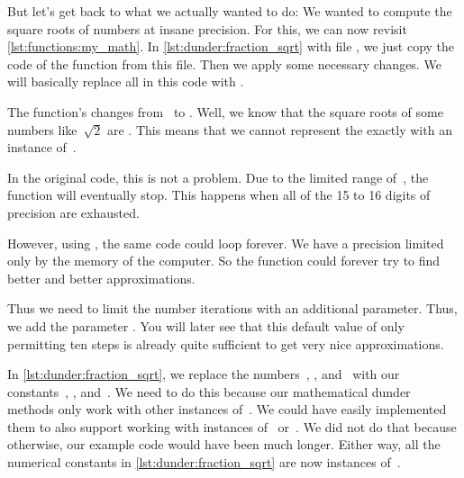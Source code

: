 But let's get back to what we actually wanted to do:
We wanted to compute the square roots of numbers at insane precision.
For this, we can now revisit \cref{lst:functions:my_math}.
In \cref{lst:dunder:fraction_sqrt} with file , we just copy the code of the  function from this file.
Then we apply some necessary changes.
We will basically replace all  in this code with .%
%
\begin{sloppypar}%
The function's  changes from~ to .
Well, we know that the square roots of some numbers like~$\sqrt{2}$ are .
This means that we cannot represent the exactly with an instance of~.%
\end{sloppypar}%
%
In the original code, this is not a problem.
Due to the limited range of~, the function will eventually stop.
This happens when all of the 15 to 16 digits of precision are exhausted.

However, using , the same code could loop forever.
We have a precision limited only by the memory of the computer.
So the function could forever try to find better and better approximations.

Thus we need to limit the number iterations with an additional parameter.
Thus, we add the parameter .
You will later see that this default value of only permitting ten steps is already quite sufficient to get very nice approximations.

In \cref{lst:dunder:fraction_sqrt}, we replace the numbers~, , and~ with our constants~, , and~.
We need to do this because our mathematical dunder methods only work with other instances of~.
We could have easily implemented them to also support working with instances of~ or~.
We did not do that because otherwise, our example code would have been much longer.
Either way, all the numerical constants in \cref{lst:dunder:fraction_sqrt} are now instances of~.

